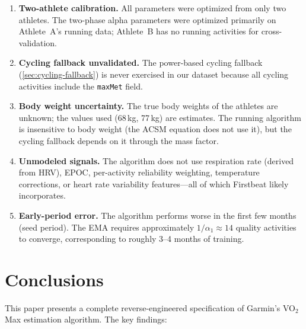\documentclass[11pt,a4paper]{article}
\begin{document}
\begin{enumerate}
    \item \textbf{Two-athlete calibration.}
    All parameters were optimized from only two athletes.
    The two-phase alpha parameters were optimized primarily on Athlete~A's running data; Athlete~B has no running activities for cross-validation.

    \item \textbf{Cycling fallback unvalidated.}
    The power-based cycling fallback (\cref{sec:cycling-fallback}) is never exercised in our dataset because all cycling activities include the \texttt{maxMet} field.

    \item \textbf{Body weight uncertainty.}
    The true body weights of the athletes are unknown; the values used (68\,kg, 77\,kg) are estimates.
    The running algorithm is insensitive to body weight (the ACSM equation does not use it), but the cycling fallback depends on it through the mass factor.

    \item \textbf{Unmodeled signals.}
    The algorithm does not use respiration rate (derived from HRV), EPOC, per-activity reliability weighting, temperature corrections, or heart rate variability features---all of which Firstbeat likely incorporates.

    \item \textbf{Early-period error.}
    The algorithm performs worse in the first few months (seed period).
    The EMA requires approximately $1/\alpha_1 \approx 14$ quality activities to converge, corresponding to roughly 3--4 months of training.
\end{enumerate}


\section{Conclusions}
\label{sec:conclusions}

This paper presents a complete reverse-engineered specification of Garmin's VO$_2$Max estimation algorithm.
The key findings:
\end{document}
